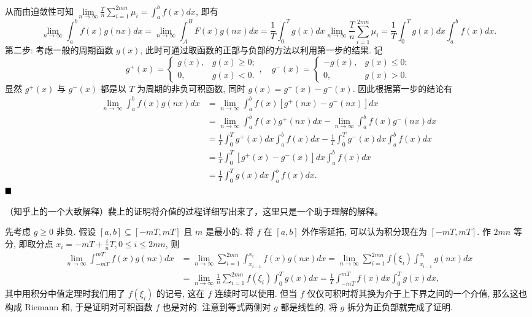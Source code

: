 \documentclass[lang=cn,newtx,10pt,scheme=chinese]{elegantbook}
\begin{document}
\begin{solution}
从而由迫敛性可知 $\lim\limits_{n \to \infty} \frac{T}{n} \sum\limits_{i=1}^{2mn} \mu_i = \int_a^b f(x) dx$, 即有
$$\lim_{n \to \infty} \int_a^b f(x)g(nx) dx = \lim_{n \to \infty} \int_A^B F(x)g(nx) dx = \frac{1}{T} \int_0^T g(x) dx \lim_{n \to \infty} \frac{T}{n} \sum_{i=1}^{2mn} \mu_i = \frac{1}{T} \int_0^T g(x) dx \int_a^b f(x) dx.$$
第二步: 考虑一般的周期函数 $g(x)$, 此时可通过取函数的正部与负部的方法以利用第一步的结果. 记
$$g^+(x) = \begin{cases} g(x), & g(x) \ge 0; \\ 0, & g(x) < 0. \end{cases}, \quad g^-(x) = \begin{cases} -g(x), & g(x) \le 0; \\ 0, & g(x) > 0. \end{cases}$$
显然 $g^+(x)$ 与 $g^-(x)$ 都是以 $T$ 为周期的非负可积函数, 同时 $g(x) = g^+(x) - g^-(x)$. 因此根据第一步的结论有
\begin{align*} \lim_{n \to \infty} \int_a^b f(x)g(nx) dx &= \lim_{n \to \infty} \int_a^b f(x)[g^+(nx) - g^-(nx)] dx \\ &= \lim_{n \to \infty} \int_a^b f(x)g^+(nx) dx - \lim_{n \to \infty} \int_a^b f(x)g^-(nx) dx \\ &= \frac{1}{T} \int_0^T g^+(x) dx \int_a^b f(x) dx - \frac{1}{T} \int_0^T g^-(x) dx \int_a^b f(x) dx \\ &= \frac{1}{T} \int_0^T [g^+(x) - g^-(x)] dx \int_a^b f(x) dx \\ &= \frac{1}{T} \int_0^T g(x) dx \int_a^b f(x) dx. \quad \end{align*}$\hfill \blacksquare $
\end{solution}

\begin{remark}
（知乎上的一个大致解释）裴上的证明将介值的过程详细写出来了，这里只是一个助于理解的解释。

先考虑 $g \ge 0$ 非负. 假设 $[a, b] \subseteq [-mT, mT]$ 且 $m$ 是最小的. 将 $f$ 在 $[a, b]$ 外作零延拓, 可以认为积分现在为 $[-mT, mT]$. 作 $2mn$ 等分, 即取分点
$x_i = -mT + \frac{i}{n}T, 0 \le i \le 2mn$, 则
\begin{align*} \lim_{n \to \infty} \int_{-mT}^{mT} f(x)g(nx) dx &= \lim_{n \to \infty} \sum_{i=1}^{2mn} \int_{x_{i-1}}^{x_i} f(x)g(nx) dx = \lim_{n \to \infty} \sum_{i=1}^{2mn} f(\xi_i) \int_{x_{i-1}}^{x_i} g(nx) dx \\ &= \lim_{n \to \infty} \frac{1}{n} \sum_{i=1}^{2mn} f(\xi_i) \int_0^T g(x) dx = \frac{1}{T} \int_{-mT}^{mT} f(x) dx \int_0^T g(x) dx, \end{align*}
其中用积分中值定理时我们用了 $f(\xi_i)$ 的记号, 这在 $f$ 连续时可以使用. 但当 $f$ 仅仅可积时将其换为介于上下界之间的一个介值, 那么这也构成 Riemann 和, 于是证明对可积函数 $f$ 也是对的.
注意到等式两侧对 $g$ 都是线性的, 将 $g$ 拆分为正负部就完成了证明. 
\end{remark}
\end{document}
